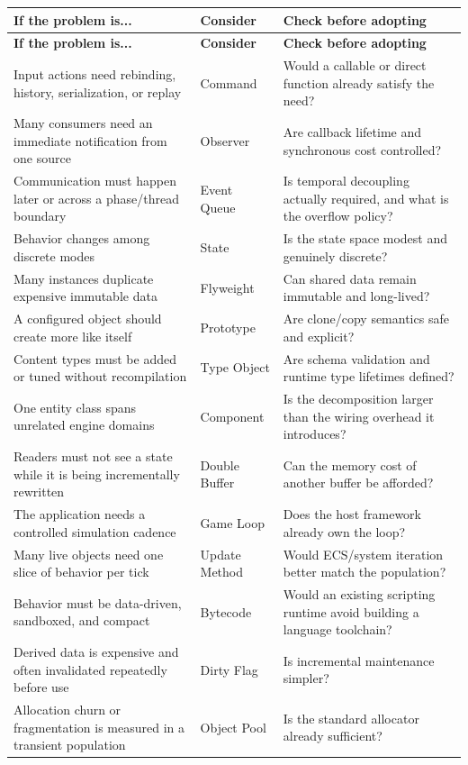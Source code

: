 \documentclass[11pt]{article}
\begin{document}
\begin{longtable}{P{6.3cm}P{3.1cm}P{6.2cm}}
\toprule
\textbf{If the problem is...} & \textbf{Consider} & \textbf{Check before adopting}\\
\midrule
\endfirsthead
\toprule
\textbf{If the problem is...} & \textbf{Consider} & \textbf{Check before adopting}\\
\midrule
\endhead
Input actions need rebinding, history, serialization, or replay & Command & Would a callable or direct function already satisfy the need?\\
Many consumers need an immediate notification from one source & Observer & Are callback lifetime and synchronous cost controlled?\\
Communication must happen later or across a phase/thread boundary & Event Queue & Is temporal decoupling actually required, and what is the overflow policy?\\
Behavior changes among discrete modes & State & Is the state space modest and genuinely discrete?\\
Many instances duplicate expensive immutable data & Flyweight & Can shared data remain immutable and long-lived?\\
A configured object should create more like itself & Prototype & Are clone/copy semantics safe and explicit?\\
Content types must be added or tuned without recompilation & Type Object & Are schema validation and runtime type lifetimes defined?\\
One entity class spans unrelated engine domains & Component & Is the decomposition larger than the wiring overhead it introduces?\\
Readers must not see a state while it is being incrementally rewritten & Double Buffer & Can the memory cost of another buffer be afforded?\\
The application needs a controlled simulation cadence & Game Loop & Does the host framework already own the loop?\\
Many live objects need one slice of behavior per tick & Update Method & Would ECS/system iteration better match the population?\\
Behavior must be data-driven, sandboxed, and compact & Bytecode & Would an existing scripting runtime avoid building a language toolchain?\\
Derived data is expensive and often invalidated repeatedly before use & Dirty Flag & Is incremental maintenance simpler?\\
Allocation churn or fragmentation is measured in a transient population & Object Pool & Is the standard allocator already sufficient?\\

\end{longtable}
\end{document}
